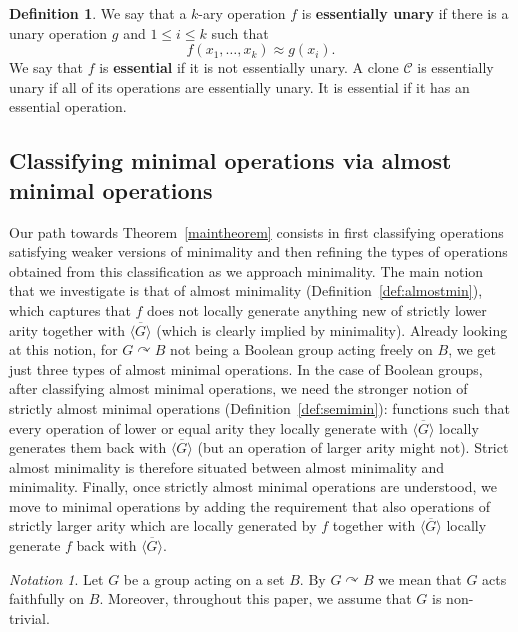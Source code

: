 \documentclass{article}
\theoremstyle{remark}
\newtheorem{notation}[theorem]{Notation}
\theoremstyle{definition}
\newtheorem{definition}[theorem]{Definition}
\def\acts{\curvearrowright}
\begin{document}
\begin{definition}\label{def:essential} We say that a $k$-ary operation $f$ is \textbf{essentially unary} if there is a unary operation $g$ and $1\leq i\leq k$ such that
\[f(x_1, \dots, x_k)\approx g(x_i).\]
We say that $f$ is \textbf{essential} if it is not essentially unary.  A clone $\mathcal{C}$ is essentially unary if all of its operations are essentially unary. It is essential if it has an essential operation.
\end{definition}





\subsection{Classifying minimal operations via almost minimal operations}\label{sub:main}
Our path towards  Theorem~\ref{maintheorem}  consists in first classifying operations satisfying weaker versions of minimality and then refining the types of operations obtained from this classification as we approach minimality. The main notion that we investigate is that of almost minimality (Definition~\ref{def:almostmin}), which captures that $f$ does not locally generate anything new of strictly lower arity together with $\overline{\langle G\rangle}$ (which is clearly implied by minimality). Already looking at this notion, for $G\acts B$ not being a Boolean group acting freely on $B$, we get just three types of almost minimal operations. In the case of Boolean groups, after classifying almost minimal operations, we need the  stronger  notion  of  strictly almost minimal operations (Definition~\ref{def:semimin}): functions such that every operation of lower or equal arity they locally generate with $\overline{\langle G\rangle}$ locally generates them back with $\overline{\langle G\rangle}$ (but an operation of larger   arity might not). Strict almost minimality is therefore situated between almost minimality and minimality. Finally, once strictly almost minimal operations are understood, we move to minimal operations by adding the requirement that also operations of strictly larger arity which are locally generated by $f$ together with $\overline{\langle G\rangle}$ locally generate $f$ back with $\overline{\langle G\rangle}$.\\

\begin{notation}
   Let $G$ be a group acting on a set $B$. By $G\acts B$ we mean that $G$ acts faithfully on $B$. Moreover, throughout this paper, we assume that $G$ is non-trivial.
\end{notation}
\end{document}
